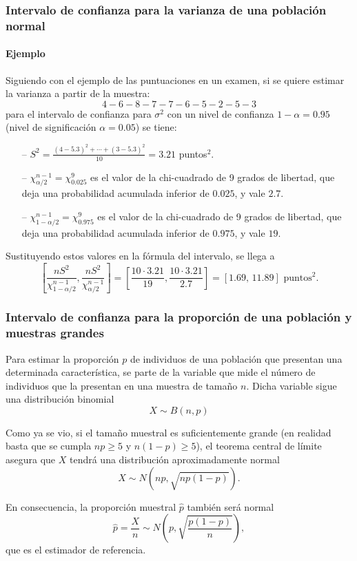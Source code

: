 \begin{frame}
\frametitle{Intervalo de confianza para la varianza de una población normal}
\framesubtitle{Ejemplo}
Siguiendo con el ejemplo de las puntuaciones en un examen, si se quiere estimar la varianza a partir de la muestra:
\[
4 - 6 - 8 - 7 - 7 - 6 - 5 - 2 - 5 - 3
\]
para el intervalo de confianza para $\sigma^2$ con un nivel de confianza $1-\alpha=0.95$ (nivel de significación $\alpha=0.05$) se tiene:
\begin{itemize}
\item[--] $S^2= \frac{(4-5.3)^2+\cdots+(3-5.3)^2}{10} = 3.21$ puntos$^2$.
\item[--] $\chi^{n-1}_{\alpha/2}=\chi^9_{0.025}$ es el valor de la chi-cuadrado de 9 grados de libertad, que deja una probabilidad acumulada
inferior de $0.025$, y vale $2.7$.
\item[--] $\chi^{n-1}_{1-\alpha/2}=\chi^9_{0.975}$ es el valor de la chi-cuadrado de 9 grados de libertad, que deja una probabilidad
acumulada inferior de $0.975$, y vale $19$.
\end{itemize}
Sustituyendo estos valores en la fórmula del intervalo, se llega a
\[
\left[\frac{nS^2}{\chi^{n-1}_{1-\alpha/2}},\frac{nS^2}{\chi^{n-1}_{\alpha/2}}\right] =
\left[\frac{10\cdot 3.21}{19},\frac{10\cdot 3.21}{2.7}\right] = [1.69,\,11.89] \text{ puntos}^2.
\]
\end{frame}


\begin{frame}
\frametitle{Intervalo de confianza para la proporción de una población y muestras grandes}
Para estimar la proporción $p$ de individuos de una población que presentan una determinada característica, se parte de la variable que mide el número de individuos que la presentan en una muestra de tamaño $n$.
Dicha variable sigue una distribución binomial
\[
X\sim B(n,p)
\]

Como ya se vio, si el tamaño muestral es suficientemente grande (en realidad basta que se cumpla $np\geq 5$ y $n(1-p)\geq 5$), el teorema central de límite asegura que $X$ tendrá una distribución aproximadamente normal
\[
X\sim N(np,\sqrt{np(1-p)}).
\]

En consecuencia, la proporción muestral $\hat p$ también será normal
\[
\hat{p}=\frac{X}{n} \sim N\left(p,\sqrt{\frac{p(1-p)}{n}}\right),
\]
que es el estimador de referencia.
\end{frame}


